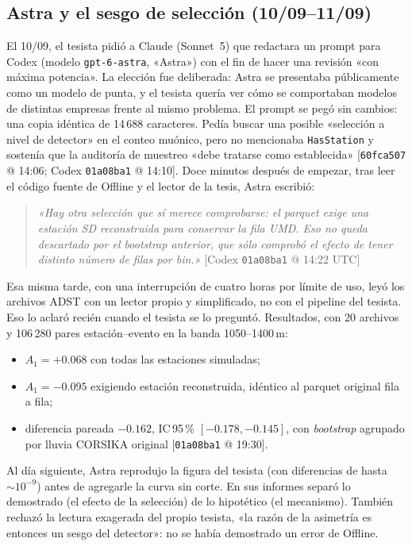 \documentclass[11pt,a4paper]{article}
\newcommand{\ev}[1]{{\small\color{nota}[#1]}}   %
\newcommand{\code}[1]{\texttt{#1}}
\begin{document}
\subsection{Astra y el sesgo de selección (10/09--11/09)}
El 10/09, el tesista pidió a Claude (Sonnet~5) que redactara un prompt para Codex (modelo
\code{gpt-6-astra}, «Astra») con el fin de hacer una revisión «con máxima potencia». La elección fue
deliberada: Astra se presentaba públicamente como un modelo de punta, y el tesista quería ver cómo se
comportaban modelos de distintas empresas frente al mismo problema. El prompt se pegó sin
cambios: una copia idéntica de 14\,688 caracteres. Pedía buscar una posible «selección a nivel de detector»
en el conteo muónico, pero no mencionaba \code{HasStation} y sostenía que la auditoría de muestreo «debe
tratarse como establecida» \ev{\code{60fca507} @ 14:06; Codex \code{01a08ba1} @ 14:10}. Doce minutos
después de empezar, tras leer el código fuente de Offline y el lector de la tesis, Astra escribió:
\begin{quote}
\emph{«Hay otra selección que sí merece comprobarse: el parquet exige una estación SD reconstruida para
conservar la fila UMD. Eso no queda descartado por el bootstrap anterior, que sólo comprobó el efecto de
tener distinto número de filas por bin.»} \ev{Codex \code{01a08ba1} @ 14:22 UTC}
\end{quote}
Esa misma tarde, con una interrupción de cuatro horas por límite de uso, leyó los archivos ADST con un lector
propio y simplificado, no con el pipeline del tesista. Eso lo aclaró recién cuando el tesista se lo preguntó.
Resultados, con 20 archivos y 106\,280 pares estación--evento en la banda 1050--1400\,m:
\begin{itemize}
  \item $A_1=+0.068$ con todas las estaciones simuladas;
  \item $A_1=-0.095$ exigiendo estación reconstruida, idéntico al parquet original fila a fila;
  \item diferencia pareada $-0.162$, IC\,95\,\% $[-0.178,-0.145]$, con \emph{bootstrap} agrupado por lluvia
  CORSIKA original \ev{\code{01a08ba1} @ 19:30}.
\end{itemize}
Al día siguiente, Astra reprodujo la figura del tesista (con diferencias de hasta $\sim10^{-9}$) antes de
agregarle la curva sin corte. En sus informes separó lo demostrado (el efecto de la selección) de lo
hipotético (el mecanismo). También rechazó la lectura exagerada del propio tesista, «la razón de la
asimetría es entonces un sesgo del detector»: no se había demostrado un error de Offline.
\end{document}
